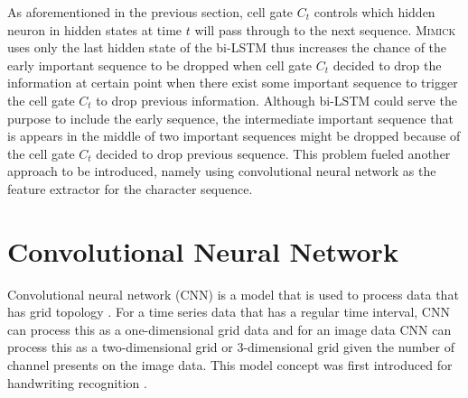     As aforementioned in the previous section, cell gate $C_t$
    controls which hidden neuron in hidden states at time $t$ will
    pass through to the next sequence. \textsc{Mimick} uses only the
    last hidden state of the bi-LSTM thus increases the chance of the
    early important sequence to be dropped when cell gate $C_t$
    decided to drop the information at certain point when there exist
    some important sequence to trigger the cell gate $C_t$ to drop
    previous information. Although bi-LSTM could serve the purpose to
    include the early sequence, the intermediate important sequence
    that is appears in the middle of two important sequences might
    be dropped because of the cell gate $C_t$ decided to drop previous
    sequence. This problem fueled another approach to be introduced,
    namely using convolutional neural network as the feature extractor
    for the character sequence.

\section{Convolutional Neural Network}
    Convolutional neural network (CNN) is a model that is used to
    process data that has grid topology \citep{Goodfellow-et-al-2016}.
    For a time series data that has a regular time interval, CNN can
    process this as a one-dimensional grid data and for an image data
    CNN can process this as a two-dimensional grid or 3-dimensional
    grid given the number of channel presents on the image data. This
    model concept was first introduced for handwriting recognition
    \citep{generalization1989lecun}.

